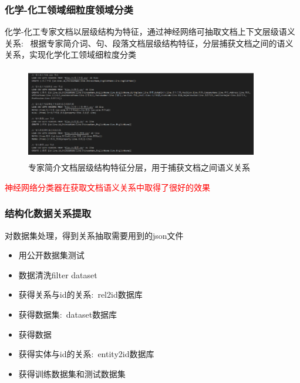 \begin{frame}
	\frametitle{化学-化工领域细粒度领域分类}
化学-化工专家文档以层级结构为特征，通过神经网络可抽取文档上下文层级语义关系:~
根据专家简介词、句、段落文档层级结构特征，分层捕获文档之间的语义关系，实现化学化工领域细粒度分类
\begin{figure}[h!]
\centering
\includegraphics[height=1.60in,width=4.00in,viewport=0 0 210 80,clip]{Figures/KG_Chem-extract.png}
\caption{\tiny 专家简介文档层级结构特征分层，用于捕获文档之间语义关系}%
\label{Fig:KG_Chem-Extract}
\end{figure}
\textcolor{red}{神经网络分类器在获取文档语义关系中取得了很好的效果}
\end{frame}

\begin{frame}
	\frametitle{结构化数据关系提取}
	对数据集处理，得到关系抽取需要用到的\textrm{json}文件
\begin{itemize}
	\item 用公开数据集测试%
	\item 数据清洗\textrm{filter dataset}
	\item 获得关系与\textrm{id}的关系:~\textrm{rel2id}数据库
	\item 获得数据集:~\textrm{dataset}数据库
	\item 获得数据
	\item 获得实体与\textrm{id}的关系:~\textrm{entity2id}数据库
	\item 获得训练数据集和测试数据集
\end{itemize}
\end{frame}

